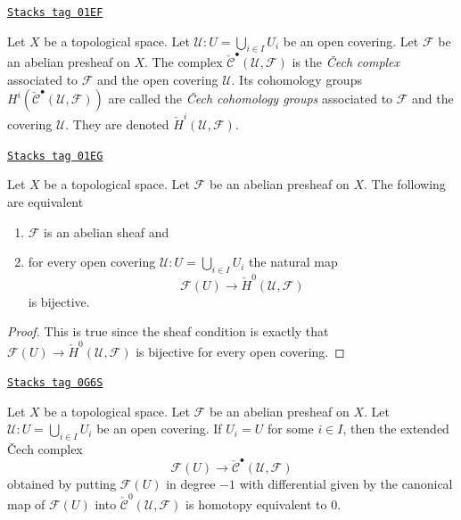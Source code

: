 \begin{definition}
\label{cohomology-definition-cech-complex}
\href{https://stacks.math.columbia.edu/tag/01EF}{\texttt{Stacks tag 01EF}}

Let $X$ be a topological space.
Let $\mathcal{U} : U = \bigcup_{i \in I} U_i$ be an open covering.
Let $\mathcal{F}$ be an abelian presheaf on $X$.
The complex $\check{\mathcal{C}}^\bullet(\mathcal{U}, \mathcal{F})$
is the {\it {\v C}ech complex} associated to $\mathcal{F}$ and the
open covering $\mathcal{U}$. Its cohomology groups
$H^i(\check{\mathcal{C}}^\bullet(\mathcal{U}, \mathcal{F}))$ are
called the {\it {\v C}ech cohomology groups} associated to
$\mathcal{F}$ and the covering $\mathcal{U}$.
They are denoted $\check H^i(\mathcal{U}, \mathcal{F})$.
\end{definition}

\begin{lemma}[Cech h0]
\label{cohomology-lemma-cech-h0}
\href{https://stacks.math.columbia.edu/tag/01EG}{\texttt{Stacks tag 01EG}}

Let $X$ be a topological space.
Let $\mathcal{F}$ be an abelian presheaf on $X$.
The following are equivalent
\begin{enumerate}
\item $\mathcal{F}$ is an abelian sheaf and
\item for every open covering $\mathcal{U} : U = \bigcup_{i \in I} U_i$
the natural map
$$
\mathcal{F}(U) \to \check{H}^0(\mathcal{U}, \mathcal{F})
$$
is bijective.
\end{enumerate}
\end{lemma}

\begin{proof}
This is true since the sheaf condition is exactly that
$\mathcal{F}(U) \to \check{H}^0(\mathcal{U}, \mathcal{F})$
is bijective for every open covering.
\end{proof}

\begin{lemma}
\label{cohomology-lemma-cech-trivial}
\href{https://stacks.math.columbia.edu/tag/0G6S}{\texttt{Stacks tag 0G6S}}

Let $X$ be a topological space. Let $\mathcal{F}$ be an abelian presheaf on $X$.
Let $\mathcal{U} : U = \bigcup_{i \in I} U_i$ be an open covering. If
$U_i = U$ for some $i \in I$, then the extended {\v C}ech complex
$$
\mathcal{F}(U) \to \check{\mathcal{C}}^\bullet(\mathcal{U}, \mathcal{F})
$$
obtained by putting $\mathcal{F}(U)$ in degree $-1$ with differential given by
the canonical map of $\mathcal{F}(U)$ into
$\check{\mathcal{C}}^0(\mathcal{U}, \mathcal{F})$
is homotopy equivalent to $0$.
\end{lemma}

